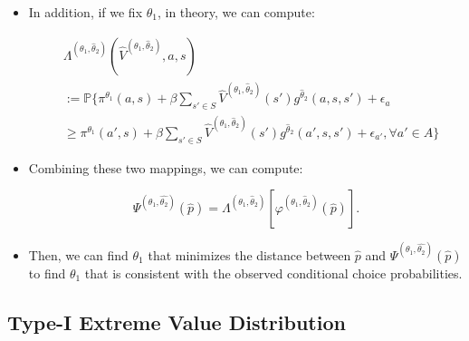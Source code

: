 \documentclass[]{book}
\providecommand{\tightlist}{%
  \setlength{\itemsep}{0pt}\setlength{\parskip}{0pt}}
\begin{document}
\begin{itemize}
\tightlist
\item
  In addition, if we fix \(\theta_1\), in theory, we can compute:

  \begin{equation}
  \begin{split}
  &\Lambda^{(\theta_1, \hat{\theta}_2)}(\hat{V}^{(\theta_1, \hat{\theta}_2)}, a, s)\\
  &:= \mathbb{P}\Bigg\{\pi^{\theta_1}(a , s) + \beta \sum_{s' \in S} \hat{V}^{(\theta_1, \hat{\theta}_2)}(s') g^{\hat{\theta}_2}(a, s, s') + \epsilon_a\\
  &\ge \pi^{\theta_1}(a' , s) + \beta \sum_{s' \in S} \hat{V}^{(\theta_1, \hat{\theta}_2)}(s') g^{\hat{\theta}_2}(a', s, s') + \epsilon_{a'}, \forall a' \in A \Bigg\}
  \end{split}
  \end{equation}
\item
  Combining these two mappings, we can compute:

  \begin{equation}
  \Psi^{(\theta_1, \hat{\theta_2})}(\hat{p}) = \Lambda^{(\theta_1, \hat{\theta}_2)}[\varphi^{(\theta_1, \hat{\theta}_2)}(\hat{p})].
  \end{equation}
\item
  Then, we can find \(\theta_1\) that minimizes the distance between
  \(\hat{p}\) and \(\Psi^{(\theta_1, \hat{\theta_2})}(\hat{p})\) to find
  \(\theta_1\) that is consistent with the observed conditional choice
  probabilities.
\end{itemize}

\subsection{Type-I Extreme Value
Distribution}\label{type-i-extreme-value-distribution}
\end{document}
